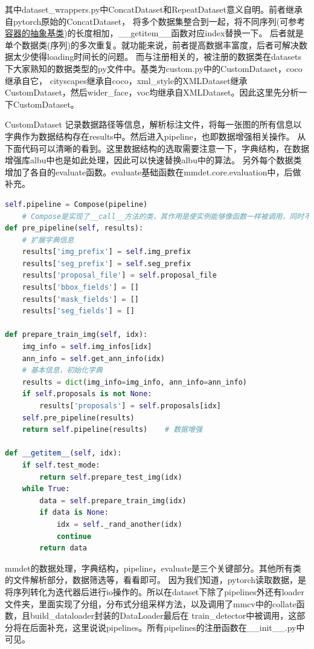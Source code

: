 \documentclass[UTF8]{ctexart}
\begin{document}
其中dataset\_wrappers.py中ConcatDataset和RepeatDataset意义自明。前者继承自pytorch原始的ConcatDataset，
将多个数据集整合到一起，将不同序列(可参考\href{https://docs.python.org/zh-cn/3/library/collections.abc.html}
{容器的抽象基类})的长度相加，\_\_getitem\_\_函数对应index替换一下。
后者就是单个数据类(序列)的多次重复。就功能来说，前者提高数据丰富度，后者可解决数据太少使得loading时间长的问题。
而与注册相关的，被注册的数据类在datasets下大家熟知的数据类型的py文件中。基类为custom.py中的CustomDataset，coco继承自它，
cityscapes继承自coco，xml\_style的XMLDataset继承CustomDataset，然后wider\_face，voc均继承自XMLDataset。因此这里先分析一下CustomDataset。


CustomDataset 记录数据路径等信息，解析标注文件，将每一张图的所有信息以字典作为数据结构存在results中。然后进入pipeline，也即数据增强相关操作。
从下面代码可以清晰的看到。这里数据结构的选取需要注意一下，字典结构，在数据增强库albu中也是如此处理，因此可以快速替换albu中的算法。
另外每个数据类增加了各自的evaluate函数。evaluate基础函数在mmdet.core.evaluation中，后做补充。

\lstset{style=mystyle}
\begin{lstlisting}[language=Python]
	self.pipeline = Compose(pipeline)   
	# Compose是实现了__call__方法的类，其作用是使实例能够像函数一样被调用，同时不影响实例本身的生命周期
def pre_pipeline(self, results):
	# 扩展字典信息
	results['img_prefix'] = self.img_prefix
	results['seg_prefix'] = self.seg_prefix
	results['proposal_file'] = self.proposal_file
	results['bbox_fields'] = []
	results['mask_fields'] = []
	results['seg_fields'] = []

def prepare_train_img(self, idx):
	img_info = self.img_infos[idx]
	ann_info = self.get_ann_info(idx)
	# 基本信息，初始化字典
	results = dict(img_info=img_info, ann_info=ann_info)
	if self.proposals is not None:
		results['proposals'] = self.proposals[idx]
	self.pre_pipeline(results)
	return self.pipeline(results)    # 数据增强

def __getitem__(self, idx):
	if self.test_mode:
		return self.prepare_test_img(idx)
	while True:
		data = self.prepare_train_img(idx)
		if data is None:
			idx = self._rand_another(idx)
			continue
		return data
\end{lstlisting}

mmdet的数据处理，字典结构，pipeline，evaluate是三个关键部分。其他所有类的文件解析部分，数据筛选等，看看即可。
因为我们知道，pytorch读取数据，是将序列转化为迭代器后进行io操作的。所以在dataset下除了pipelines外还有loader
文件夹，里面实现了分组，分布式分组采样方法，以及调用了mmcv中的collate函数，且build\_dataloader封装的DataLoader最后在
train\_detector中被调用，这部分将在后面补充，这里说说pipelines。所有pipelines的注册函数在\_\_init\_\_.py中可见。
\end{document}
